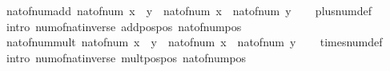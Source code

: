 \begin{isabellebody}
\endisatagproof
{\isafoldproof}%
%
\isadelimproof
\isanewline
%
\endisadelimproof
\isanewline
{}\isamarkupfalse%
\isanewline
\isanewline
{}\isamarkupfalse%
\ nat{\isacharunderscore}{\kern0pt}of{\isacharunderscore}{\kern0pt}num{\isacharunderscore}{\kern0pt}add{\isacharcolon}{\kern0pt}\ {\isachardoublequoteopen}nat{\isacharunderscore}{\kern0pt}of{\isacharunderscore}{\kern0pt}num\ {\isacharparenleft}{\kern0pt}x\ {\isacharplus}{\kern0pt}\ y{\isacharparenright}{\kern0pt}\ {\isacharequal}{\kern0pt}\ nat{\isacharunderscore}{\kern0pt}of{\isacharunderscore}{\kern0pt}num\ x\ {\isacharplus}{\kern0pt}\ nat{\isacharunderscore}{\kern0pt}of{\isacharunderscore}{\kern0pt}num\ y{\isachardoublequoteclose}\isanewline
%
\isadelimproof
\ \ %
\endisadelimproof
%
\isatagproof
{}\isamarkupfalse%
\ plus{\isacharunderscore}{\kern0pt}num{\isacharunderscore}{\kern0pt}def\isanewline
\ \ \isamarkupfalse%
\ {\isacharparenleft}{\kern0pt}intro\ num{\isacharunderscore}{\kern0pt}of{\isacharunderscore}{\kern0pt}nat{\isacharunderscore}{\kern0pt}inverse\ add{\isacharunderscore}{\kern0pt}pos{\isacharunderscore}{\kern0pt}pos\ nat{\isacharunderscore}{\kern0pt}of{\isacharunderscore}{\kern0pt}num{\isacharunderscore}{\kern0pt}pos{\isacharparenright}{\kern0pt}%
\endisatagproof
{\isafoldproof}%
%
\isadelimproof
\isanewline
%
\endisadelimproof
\isanewline
{}\isamarkupfalse%
\ nat{\isacharunderscore}{\kern0pt}of{\isacharunderscore}{\kern0pt}num{\isacharunderscore}{\kern0pt}mult{\isacharcolon}{\kern0pt}\ {\isachardoublequoteopen}nat{\isacharunderscore}{\kern0pt}of{\isacharunderscore}{\kern0pt}num\ {\isacharparenleft}{\kern0pt}x\ {\isacharasterisk}{\kern0pt}\ y{\isacharparenright}{\kern0pt}\ {\isacharequal}{\kern0pt}\ nat{\isacharunderscore}{\kern0pt}of{\isacharunderscore}{\kern0pt}num\ x\ {\isacharasterisk}{\kern0pt}\ nat{\isacharunderscore}{\kern0pt}of{\isacharunderscore}{\kern0pt}num\ y{\isachardoublequoteclose}\isanewline
%
\isadelimproof
\ \ %
\endisadelimproof
%
\isatagproof
{}\isamarkupfalse%
\ times{\isacharunderscore}{\kern0pt}num{\isacharunderscore}{\kern0pt}def\isanewline
\ \ \isamarkupfalse%
\ {\isacharparenleft}{\kern0pt}intro\ num{\isacharunderscore}{\kern0pt}of{\isacharunderscore}{\kern0pt}nat{\isacharunderscore}{\kern0pt}inverse\ mult{\isacharunderscore}{\kern0pt}pos{\isacharunderscore}{\kern0pt}pos\ nat{\isacharunderscore}{\kern0pt}of{\isacharunderscore}{\kern0pt}num{\isacharunderscore}{\kern0pt}pos{\isacharparenright}{\kern0pt}%
\endisatagproof
{\isafoldproof}%
%
\isadelimproof

\end{isabellebody}

